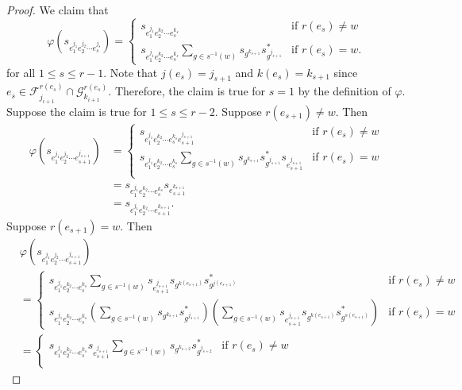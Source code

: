 \documentclass[12pt]{amsbook}%
\renewcommand{\phi}{\varphi}
\theoremstyle{defin}
\theoremstyle{remark}
\numberwithin{equation}{chapter}
\numberwithin{theor}{section}
\begin{document}
\begin{proof}
We claim that 
\[
\phi ( s_{ e_1^{j_1} e_{2}^{j_2} \cdots e_s^{j_s}} ) = 
\begin{cases}
s_{ e_1^{ j_1 } e_2^{ k_2 } \cdots e_{s}^{k_s}} &\text{if } r( e_s ) \neq w \\
s_{ e_1^{ j_1 } e_2^{ k_2 } \cdots e_{s}^{k_s} } \displaystyle \sum_{g \in s^{-1} (w) } s_{ g^{ k_{s+1} } } s_{ g^{ j_{s+1} }}^* &\text{if } r(e_s)=w.
\end{cases}
\]
for all $1 \leq s \leq r-1$.  Note that $j(e_s) = j_{s+1}$ and $k(e_s)=k_{s+1}$ since $e_s \in \mathcal{F}^{r(e_s)}_{j_{i+1}} \cap \mathcal{G}^{r(e_s)}_{k_{i+1}}$.  Therefore, the claim is true for $s = 1$ by the definition of $\phi$.  Suppose the claim is true for $1 \leq s \leq r - 2$.  Suppose $r( e_{ s +1 } ) \neq w$.  Then 
\begin{align*}
\phi (  s_{ e_1^{j_1} e_{2}^{j_2} \cdots e_{s+1}^{j_{s+1}} } )  &= 
\begin{cases}
s_{ e_1^{ j_1 } e_2^{ k_2 } \cdots e_{s}^{k_s} e_{s+1}^{ j_{ s+1} } } &\text{if } r( e_s ) \neq w  \\ 
s_{ e_1^{ j_1 } e_2^{ k_2 } \cdots e_{s}^{k_{s}} }  \displaystyle \sum_{g \in s^{-1} (w) }  s_{ g^{ k_{s+1} } } s_{ g^{ j_{s+1} }}^*  s_{ e_{s+1}^{ j_{s+1} }}  &\text{if } r(e_s)=w \\
\end{cases} \\
&= s_{ e_1^{ j_1 } e_2^{ k_2 } \cdots e_{s}^{k_{s}} } s_{e_{s+1}^{k_{s+1}}}\\
&= s_{ e_1^{ j_1 } e_2^{ k_2 } \cdots e_{s+1}^{k_{s+1}}}.
\end{align*}  
Suppose $r(e_{s+1})=w$.  Then
\begin{align*}
&\phi (  s_{ e_1^{j_1} e_{2}^{j_2} \cdots e_{s+1}^{j_{s+1}} } )  \\
&= 
\begin{cases}
\displaystyle s_{ e_1^{ j_1 } e_2^{ k_2 } \cdots e_{s}^{k_s}} \sum_{ g \in s^{-1} (w) } s_{e_{s+1}^{j_{s+1}}}  s_{g^ { k(e_{s+1}) } } s_{ g^{ j(e_{s+1}) } }^* &\text{if } r( e_s ) \neq w  \\ 
\displaystyle s_{ e_1^{ j_1 } e_2^{ k_2 } \cdots e_{s}^{k_s} }  \left( \sum_{g \in s^{-1} (w) } s_{ g^{ k_{s+1} } } s_{ g^{ j_{s+1} }}^*\right)\left(  \sum_{ g \in s^{-1} (w) } s_{e_{s+1}^{j_{s+1}}}  s_{g^ {k(e_{s+1})} } s_{ g^{ s(e_{s+1}) } }^* \right)  &\text{if } r(e_s)=w
\end{cases}  \\
&= 
\begin{cases}
\displaystyle s_{ e_1^{ j_1 } e_2^{ k_2 } \cdots e_{s}^{k_s}} s_{e_{s+1}^{j_{s+1}}}  \sum_{ g \in s^{-1} (w) }  s_{g^ { k_{s+2} } } s_{ g^{ j_{s+2} } }^* &\text{if } r( e_s ) \neq w  \\ 

\end{cases}
\end{align*}
\end{proof}
\end{document}
